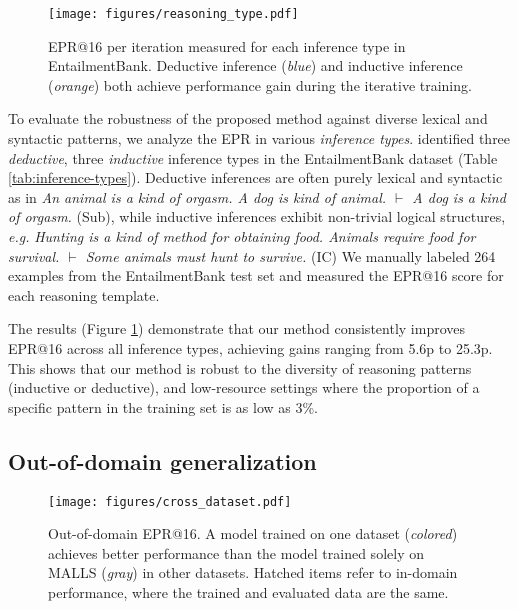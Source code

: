 

\begin{figure}[t]
    \centering
    \texttt{[image: figures/reasoning\_type.pdf]}
    \caption{EPR@16 per iteration measured for each inference type in EntailmentBank. Deductive inference (\textit{blue}) and inductive inference (\textit{orange}) both achieve performance gain during the iterative training.}
    \label{fig:reasoning_type}
\end{figure}

To evaluate the robustness of the proposed method against diverse lexical and syntactic patterns, we analyze the EPR in various \textit{inference types}. \citet{entailmentbank} identified three \textit{deductive}, three \textit{inductive} inference types in the EntailmentBank dataset (Table \ref{tab:inference-types}). Deductive inferences are often purely lexical and syntactic as in \textit{An animal is a kind of orgasm. A dog is kind of animal. $\vdash$ A dog is a kind of orgasm.} (Sub), while inductive inferences exhibit non-trivial logical structures, \textit{e.g.} \textit{Hunting is a kind of method for obtaining food. Animals require food for survival. $\vdash$ Some animals must hunt to survive.} (IC) We manually labeled 264 examples from the EntailmentBank test set and measured the EPR@16 score for each reasoning template.


The results (Figure \ref{fig:reasoning_type}) demonstrate that our method consistently improves EPR@16 across all inference types, achieving gains ranging from 5.6p to 25.3p. This shows that our method is robust to the diversity of reasoning patterns (inductive or deductive), and low-resource settings where the proportion of a specific pattern in the training set is as low as 3\%.


\subsection{Out-of-domain generalization}

\begin{figure}[t]
    \centering
    \texttt{[image: figures/cross\_dataset.pdf]}
    \caption{Out-of-domain EPR@16. A model trained on one dataset (\textit{colored}) achieves better performance than the model trained solely on MALLS (\textit{gray}) in other datasets. Hatched items refer to in-domain performance, where the trained and evaluated data are the same.}
    \label{fig:cross_dataset}
\end{figure}


